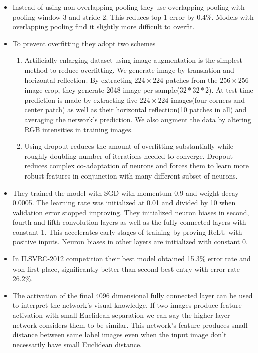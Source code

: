 \documentclass{article}
\begin{document}
\begin{itemize}
    \item Instead of using non-overlapping pooling they use overlapping pooling with pooling window 3 and stride 2. This reduces top-1 error by 0.4\%. Models with overlapping pooling find it slightly more difficult to overfit.
    \item To prevent overfitting they adopt two schemes
    \begin{enumerate}
        \item Artificially enlarging dataset using image augmentation is the simplest method to reduce overfitting. We generate image by translation and horizontal reflection. By extracting $224 \times 224$ patches from the $256\times 256$ image crop, they generate 2048 image per sample($32 *32 * 2$). At test time prediction is made by extracting five $224\times 224$ images(four corners and center patch) as well as their horizontal reflection(10 patches in all) and averaging the network's prediction. We also augment the data by altering RGB intensities in training images.
        \item Using dropout reduces the amount of overfitting substantially while roughly doubling number of iterations needed to converge. Dropout reduces complex co-adaptation of neurons and forces them to learn more robust features in conjunction with many different subset of neurons.
    \end{enumerate}
    \item They trained the model with SGD with momentum 0.9 and weight decay 0.0005. The learning rate was initialized at 0.01 and divided by 10 when validation error stopped improving. They initialized neuron biases in second, fourth and fifth convolution layers as well as the fully connected layers with constant 1. This accelerates early stages of training by proving ReLU with positive inputs. Neuron biases in other layers are initialized with constant 0.
    \item In ILSVRC-2012 competition their best model obtained 15.3\% error rate and won first place, significantly better than second best entry with error rate 26.2\%.
    \item The activation of the final 4096 dimensional fully connected layer can be used to interpret the network's visual knowledge. If two images produce feature activation with small Euclidean separation we can say the higher layer network considers them to be similar. This network's feature produces small distance between same label images even when the input image don't necessarily have small Euclidean distance.
\end{itemize}
\end{document}
